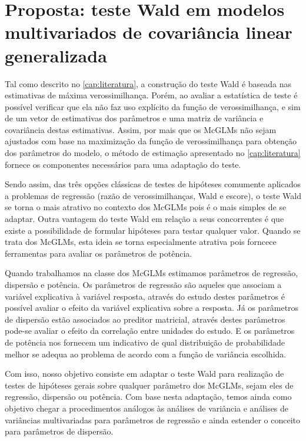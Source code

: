
\chapter{Proposta: teste Wald em modelos multivariados de covariância linear generalizada}

\label{cap:proposta}

Tal como descrito no \autoref{cap:literatura}, a construção do teste Wald é baseada nas estimativas de máxima verossimilhança. Porém, ao avaliar a estatística de teste é possível verificar que ela não faz uso explícito da função de verossimilhança, e sim de um vetor de estimativas dos parâmetros e uma matriz de variância e covariância destas estimativas. Assim, por mais que os McGLMs não sejam ajustados com base na maximização da função de verossimilhança para obtenção dos parâmetros do modelo, o método de estimação apresentado no \autoref{cap:literatura} fornece os componentes necessários para uma adaptação do teste. 

Sendo assim, das três opções clássicas de testes de hipóteses comumente aplicados a problemas de regressão (razão de verossimilhanças, Wald e escore), o teste Wald se torna o mais atrativo no contexto dos McGLMs pois é o mais simples de se adaptar. Outra vantagem do teste Wald em relação a seus concorrentes é que existe a possibilidade de formular hipóteses para testar qualquer valor. Quando se trata dos McGLMs, esta ideia se torna especialmente atrativa pois forncece ferramentas para avaliar os parâmetros de potência.

Quando trabalhamos na classe dos McGLMs estimamos parâmetros de regressão, dispersão e potência. Os parâmetros de regressão são aqueles que associam a variável explicativa à variável resposta, através do estudo destes parâmetros é possível avaliar o efeito da variável explicativa sobre a resposta. Já os parâmetros de dispersão estão associados ao preditor matricial, através destes parâmetros pode-se avaliar o efeito da correlação entre unidades do estudo. E os parâmetros de potência nos fornecem um indicativo de qual distribuição de probabilidade melhor se adequa ao problema de acordo com a função de variância escolhida. 

Com isso, nosso objetivo consiste em adaptar o teste Wald para realização de testes de hipóteses gerais sobre qualquer parâmetro dos McGLMs, sejam eles de regressão, dispersão ou potência. Com base nesta adaptação, temos ainda como objetivo chegar a procedimentos análogos às análises de variância e análises de variâncias multivariadas para parâmetros de regressão e ainda estender o conceito para parâmetros de dispersão. 

